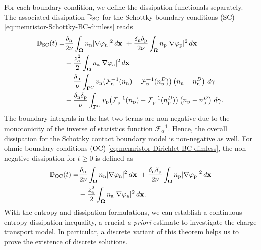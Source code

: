 \documentclass[10pt,a4paper, final]{article}
\newcommand{\reviewerTwo}[1]{\textcolor{black}{#1}}
\def\electrons{\text{n}}
\def\holes{\text{p}}
\def\ions{\text{a}}
\theoremstyle{definition}								%
\numberwithin{equation}{section}
\numberwithin{figure}{section}
\numberwithin{theorem}{section}
\begin{document}
For each boundary condition, we define the dissipation functionals separately.
The associated dissipation $\mathbb{D}_{\reviewerTwo{\text{SC}}}$ for the Schottky boundary conditions \reviewerTwo{(SC)} \eqref{eq:memristor-Schottky-BC-dimless} reads
\begin{equation} \label{eq:continuous-dissipation-Schottky}
    \begin{split}
        \mathbb{D}_{\reviewerTwo{\text{SC}}}(t)
        =&
        \frac{\delta_\electrons}{2\nu}  \int_\mathbf{\Omega} n_\electrons \vert \nabla \varphi_\electrons \vert^2  \,d\mathbf{x}
        ~
        + \frac{\delta_\electrons \delta_\holes}{2\nu}  \int_\mathbf{\Omega} n_\holes \vert \nabla \varphi_\holes \vert^2  \,d\mathbf{x}\\
        ~
        &+ \frac{z_{\ions}^2  }{2}\int_\mathbf{\Omega} n_{\ions} \vert \nabla \varphi_{\ions}\vert^2  \,d\mathbf{x}\\
        ~
        &+ \frac{\delta_\electrons}{\nu} \int_{\mathbf{\Gamma}^C}  v_\electrons  \bigl( \mathcal{F}^{-1}_\electrons (n_\electrons) - \mathcal{F}^{-1}_\electrons (n_\electrons^D) \bigr) \left( n_\electrons - n_\electrons^D \right) \,d\gamma\\
        ~
        &+ \frac{\delta_\electrons\delta_\holes}{\nu} \int_{\mathbf{\Gamma}^C} v_\holes  \bigl( \mathcal{F}^{-1}_\holes (n_\holes) - \mathcal{F}^{-1}_\holes (n_\holes^D) \bigr) \left( n_\holes - n_\holes^D \right) \,d\gamma.
    \end{split}
\end{equation}
The boundary integrals in the last two terms are non-negative due to the monotonicity of the inverse of statistics function $\mathcal{F}_\alpha^{-1}$.
Hence, the overall dissipation for the Schottky contact boundary model is non-negative as well.
For ohmic boundary conditions \reviewerTwo{(OC)} \eqref{eq:memristor-Dirichlet-BC-dimless}, the non-negative dissipation for $t \geq 0$ is defined as
\begin{equation} \label{eq:continuous-dissipation-Dirichlet}
    \begin{split}
        \mathbb{D}_{\reviewerTwo{\text{OC}}}(t)
        =&
        \frac{\delta_\electrons}{2\nu}  \int_\mathbf{\Omega} n_\electrons \vert \nabla \varphi_\electrons \vert^2  \,d\mathbf{x}
        ~
        + \frac{\delta_\electrons \delta_\holes}{2\nu}  \int_\mathbf{\Omega} n_\holes \vert \nabla \varphi_\holes \vert^2  \,d\mathbf{x}\\
        ~
        &+ \frac{z_{\ions}^2  }{2}\int_\mathbf{\Omega} n_{\ions} \vert \nabla \varphi_{\ions}\vert^2  \,d\mathbf{x}.
    \end{split}
\end{equation}
With the entropy and dissipation formulations, we can establish a continuous entropy-dissipation inequality, a crucial \textit{a priori} estimate to investigate the charge transport model.
In particular, a discrete variant of this theorem helps us to prove the existence of discrete solutions.
\end{document}
